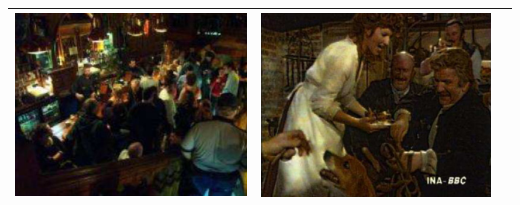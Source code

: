 \begin{table}[H]
\begin{tabular}{|c|c|c|}
\begin{minipage}{.29\textwidth}
    \includegraphics[width=\textwidth,height=\textheight,keepaspectratio]{images/pitie_target2}
  \end{minipage} & 
  \begin{minipage}{.29\textwidth}
    \includegraphics[width=\textwidth,height=\textheight,keepaspectratio]{images/pitie_result2}
  \end{minipage} \\
    \hline
\end{tabular}
\end{table}

